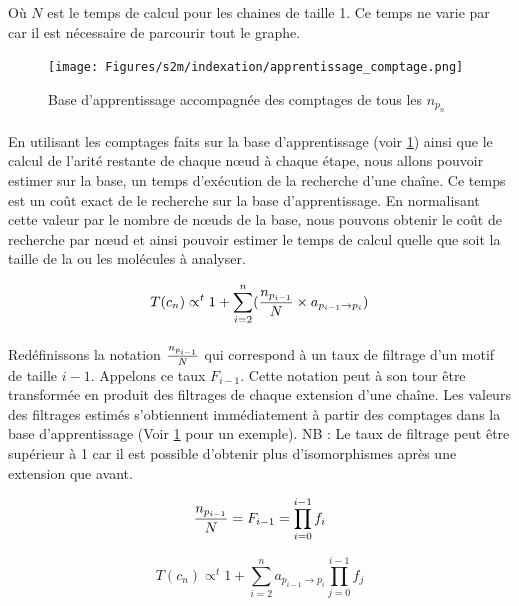 \documentclass[12pt,french,twoside]{report}
\begin{document}
Où $N$ est le temps de calcul pour les chaines de taille 1.
Ce temps ne varie par car il est nécessaire de parcourir tout le graphe.

\begin{figure}
  \texttt{[image: Figures/s2m/indexation/apprentissage\_comptage.png]}
  \caption{\label{app_compt}Base d'apprentissage accompagnée des comptages de tous les $n_{p_{n}}$}
\end{figure}

\paragraph{}En utilisant les comptages faits sur la base d'apprentissage (voir \ref{app_compt}) ainsi que le calcul de l'arité
restante de chaque n\oe{}ud à chaque étape, nous allons pouvoir estimer sur la base, un temps d'exécution de la recherche d'une
chaîne. Ce temps est un coût exact de le recherche sur la base d'apprentissage. En normalisant cette valeur par le nombre de
n\oe{}uds de la base, nous pouvons obtenir le coût de recherche par n\oe{}ud et ainsi pouvoir estimer le temps de calcul quelle que soit
la taille de la ou les molécules à analyser.

\begin{equation}
 T(c_n) \propto^t 1 + \sum_{i=2}^n ({n_{p_{i-1}} \over N} \times a_{p_{i-1} \rightarrow p_i})
\end{equation}

\paragraph{}Redéfinissons la notation ${n_{p_{i-1}} \over N}$ qui correspond à un taux de filtrage d'un motif de taille $i-1$.
Appelons ce taux $F_{i-1}$. Cette notation peut à son tour être transformée en
produit des filtrages de chaque extension d'une chaîne. Les valeurs des filtrages estimés s'obtiennent immédiatement à partir des
comptages dans la base d'apprentissage (Voir \ref{app_compt} pour un exemple). NB : Le taux de filtrage peut être supérieur à 1
car il est possible d'obtenir plus d'isomorphismes après une extension que avant.

\begin{equation}
 {n_{p_{i-1}} \over N} = F_{i-1} = \prod_{i=0}^{i-1} f_i
\end{equation}

\begin{equation}
 T(c_n) \propto^t 1 + \sum_{i=2}^n a_{p_{i-1} \rightarrow p_i} \prod_{j=0}^{i-1} f_j
\end{equation}
\end{document}

